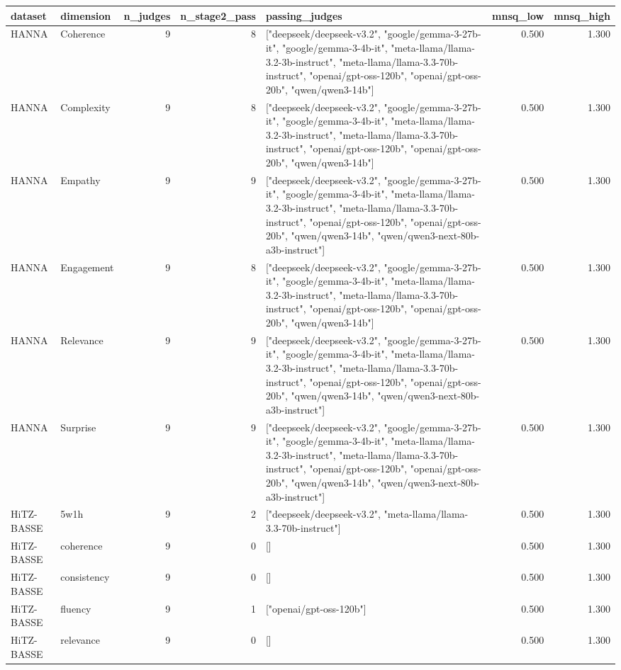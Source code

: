 \begin{tabular}{llrrlrr}
\toprule
dataset & dimension & n\_judges & n\_stage2\_pass & passing\_judges & mnsq\_low & mnsq\_high \\
\midrule
HANNA & Coherence & 9 & 8 & ["deepseek/deepseek-v3.2", "google/gemma-3-27b-it", "google/gemma-3-4b-it", "meta-llama/llama-3.2-3b-instruct", "meta-llama/llama-3.3-70b-instruct", "openai/gpt-oss-120b", "openai/gpt-oss-20b", "qwen/qwen3-14b"] & 0.500 & 1.300 \\
HANNA & Complexity & 9 & 8 & ["deepseek/deepseek-v3.2", "google/gemma-3-27b-it", "google/gemma-3-4b-it", "meta-llama/llama-3.2-3b-instruct", "meta-llama/llama-3.3-70b-instruct", "openai/gpt-oss-120b", "openai/gpt-oss-20b", "qwen/qwen3-14b"] & 0.500 & 1.300 \\
HANNA & Empathy & 9 & 9 & ["deepseek/deepseek-v3.2", "google/gemma-3-27b-it", "google/gemma-3-4b-it", "meta-llama/llama-3.2-3b-instruct", "meta-llama/llama-3.3-70b-instruct", "openai/gpt-oss-120b", "openai/gpt-oss-20b", "qwen/qwen3-14b", "qwen/qwen3-next-80b-a3b-instruct"] & 0.500 & 1.300 \\
HANNA & Engagement & 9 & 8 & ["deepseek/deepseek-v3.2", "google/gemma-3-27b-it", "google/gemma-3-4b-it", "meta-llama/llama-3.2-3b-instruct", "meta-llama/llama-3.3-70b-instruct", "openai/gpt-oss-120b", "openai/gpt-oss-20b", "qwen/qwen3-14b"] & 0.500 & 1.300 \\
HANNA & Relevance & 9 & 9 & ["deepseek/deepseek-v3.2", "google/gemma-3-27b-it", "google/gemma-3-4b-it", "meta-llama/llama-3.2-3b-instruct", "meta-llama/llama-3.3-70b-instruct", "openai/gpt-oss-120b", "openai/gpt-oss-20b", "qwen/qwen3-14b", "qwen/qwen3-next-80b-a3b-instruct"] & 0.500 & 1.300 \\
HANNA & Surprise & 9 & 9 & ["deepseek/deepseek-v3.2", "google/gemma-3-27b-it", "google/gemma-3-4b-it", "meta-llama/llama-3.2-3b-instruct", "meta-llama/llama-3.3-70b-instruct", "openai/gpt-oss-120b", "openai/gpt-oss-20b", "qwen/qwen3-14b", "qwen/qwen3-next-80b-a3b-instruct"] & 0.500 & 1.300 \\
HiTZ-BASSE & 5w1h & 9 & 2 & ["deepseek/deepseek-v3.2", "meta-llama/llama-3.3-70b-instruct"] & 0.500 & 1.300 \\
HiTZ-BASSE & coherence & 9 & 0 & [] & 0.500 & 1.300 \\
HiTZ-BASSE & consistency & 9 & 0 & [] & 0.500 & 1.300 \\
HiTZ-BASSE & fluency & 9 & 1 & ["openai/gpt-oss-120b"] & 0.500 & 1.300 \\
HiTZ-BASSE & relevance & 9 & 0 & [] & 0.500 & 1.300 \\

\end{tabular}

